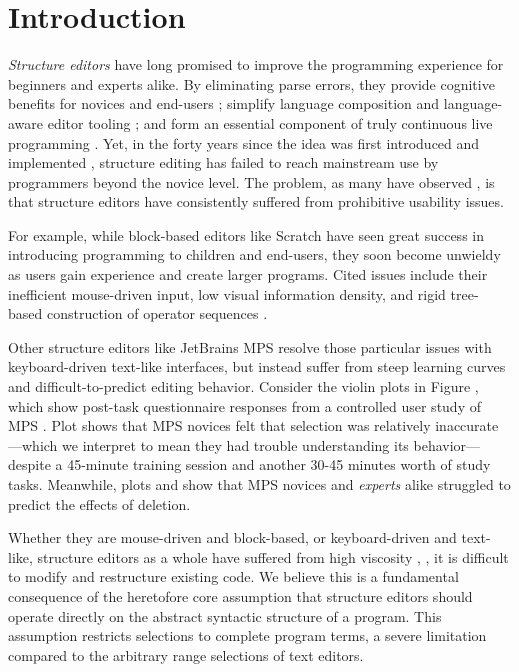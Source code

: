 \section{Introduction}\label{sec:intro}

\emph{Structure editors}
have long promised to improve the programming experience
for beginners and experts alike.
By eliminating parse errors,
they provide cognitive benefits for novices
  \cite{meta-analysis-blocks,blocks-text-high-school,coblox}
  and end-users
  \cite{weitnauer2016graspable,rousillon,BasHermans21};
  simplify language composition
  \cite{mbeddr}
  and language-aware editor tooling
  \cite{HazelnutSNAPL};
  and form an essential component of truly continuous live programming
  \cite{Hazelnut,HazelnutLive}.
Yet, in the forty years since the idea was first
introduced and implemented \cite{Cornell},
structure editing has failed to reach
mainstream use by programmers beyond the novice level.
The problem, as many have observed
\cite{user-modeling,fine-tuning-selection-semantics,
practical-lang-based-editing,lang-on-the-usefulness,
psg,Minor92,TowardUserFriendly,MillerPMV94},
is that structure editors have consistently suffered
from prohibitive usability issues.

For example, while
block-based editors like Scratch \cite{scratch}
have seen great success in introducing programming
to children and end-users, they soon become unwieldy
as users gain experience and create larger programs.
Cited issues include their inefficient mouse-driven
input, low visual information density, and rigid
tree-based construction of operator sequences
\cite{BlocksFingertips,cog-dim-blocks,blocks-and-beyond}.

Other structure editors like JetBrains MPS 
resolve those particular issues with
keyboard-driven text-like interfaces, but instead suffer
from steep learning curves and difficult-to-predict
editing behavior.
Consider the violin plots in Figure ,
which show post-task questionnaire responses from
a controlled user study of MPS \cite{ProjEfficiency}.
Plot  shows that MPS novices felt that
selection was relatively inaccurate---which we interpret to
mean they had trouble understanding its behavior---despite
a 45-minute training session and another 30-45 minutes
worth of study tasks.
Meanwhile, plots  and  show that
MPS novices and \emph{experts} alike struggled to
predict the effects of deletion.

Whether they are mouse-driven and block-based,
or keyboard-driven and text-like,
structure editors as a whole have suffered
from high viscosity \cite{cog-dim},
\ie, it is difficult to modify
and restructure existing code.
We believe this is a fundamental consequence
of the heretofore core assumption that structure editors
should operate directly on the abstract syntactic structure
of a program.
This assumption restricts selections to complete
program terms, a severe limitation compared to
the arbitrary range selections of text editors.

